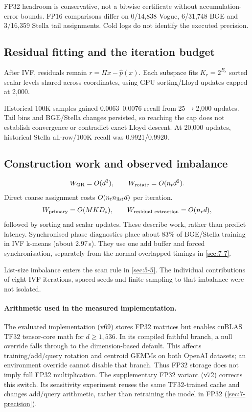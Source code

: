 FP32 headroom is conservative, not a bitwise certificate without accumulation-error bounds. FP16 comparisons differ on 0/14,838 Vogue, 6/31,748 BGE and 3/16,359 Stella tail assignments. Cold logs do not identify the executed precision.

\subsection{Residual fitting and the iteration budget}

After IVF, residuals remain $r=\Pi x-\widehat p(x)$. Each subspace fits $K_r=2^{B_r}$ sorted scalar levels shared across coordinates, using GPU sorting/Lloyd updates capped at 2,000.

Historical 100K samples gained 0.0063--0.0076 recall from 25$\to$2,000 updates. Tail bins and BGE/Stella changes persisted, so reaching the cap does not establish convergence or contradict exact Lloyd descent. At 20,000 updates, historical Stella all-row/100K recall was 0.9921/0.9920.

\subsection{Construction work and observed imbalance}

\[
 W_{\rm QR}=O(d^3),\qquad W_{\rm rotate}=O(n_t d^2).
\]
Direct coarse assignment costs $O(n_t n_{\rm list}d)$ per iteration.
\[
 W_{\rm primary}=O(MKD_s),\qquad
 W_{\rm residual\ extraction}=O(n_rd),
\]
followed by sorting and scalar updates. These describe work, rather than predict latency.
Synchronised phase diagnostics place about 83\% of BGE/Stella training
in IVF k-means (about 2.97\,s). They use one add buffer and forced
synchronisation, separately from the normal overlapped timings in
\cref{sec:7-7}.


List-size imbalance enters the scan rule in \cref{sec:5-5}. The
individual contributions of eight IVF iterations, spaced seeds and
finite sampling to that imbalance were not isolated.


\paragraph{Arithmetic used in the measured implementation.}
The evaluated implementation (v69) stores FP32 matrices but enables cuBLAS
TF32 tensor-core math for $d\geq1{,}536$. In its compiled faithful branch,
a null override falls through to the dimension-based default. This affects
training/add/query rotation and centroid GEMMs on both OpenAI datasets;
an environment override cannot disable that branch. Thus FP32 storage does
not imply full FP32 multiplication. The supplementary FP32 variant (v72)
corrects this switch. Its sensitivity experiment reuses the same
TF32-trained cache and changes add/query arithmetic, rather than retraining
the model in FP32 (\cref{sec:7-precision}).
